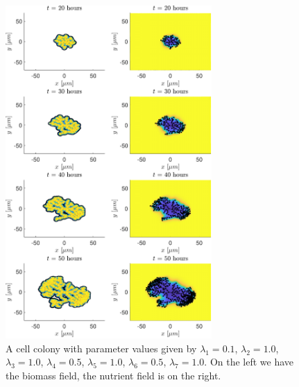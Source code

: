 \newpage

\begin{figure}[!htb] %
    \centering
    \includegraphics[width= 0.7\textwidth]{
        chapter2/figures/t_all__L1_0o10_L2_1o00_L3_1o00_L4_0o50_L5_1o00_L6_0o50_L7_1o00.pdf}
    \caption{A cell colony with parameter values given by
             $\lambda_1 = 0.1$,  
             $\lambda_2 = 1.0$, 
             $\lambda_3 = 1.0$, 
             $\lambda_4 = 0.5$, 
             $\lambda_5 = 1.0$, 
             $\lambda_6 = 0.5$, 
             $\lambda_7 = 1.0$. 
             On the left we have the biomass field, the nutrient field is on the right.}
    \label{fig: sdsd}
\end{figure}


\newpage


